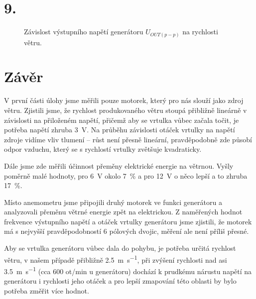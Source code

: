 \documentclass{protokol}
\begin{document}
\section{9.}
	\begin{figure*}[h!]
	\caption{Závislost výstupního napětí generátoru $ U_{OUT(p-p)} $ na rychlosti větru.}
\end{figure*}


		
\section{Závěr}
	V první části úlohy jsme měřili pouze motorek, který pro nás slouží jako zdroj větru. Zjistili jsme, že rychlost produkovaného větru stoupá přibližně lineárně v závislosti na přiloženém napětí, přičemž aby se vrtulka vůbec začala točit, je potřeba napětí zhruba \SI{3}{\volt}. Na průběhu závislosti otáček vrtulky na napětí zdroje vidíme vliv tlumení -- růst není přesně lineární, pravděpodobně zde působí odpor vzduchu, který se s rychlostí vrtulky zvětšuje kvadraticky.
	
	Dále jsme zde měřili účinnost přeměny elektrické energie na větrnou. Vyšly poměrně malé hodnoty, pro \SI{6}{V} okolo \SI{7}{\percent} a pro \SI{12}{\volt} o něco lepší a to zhruba \SI{17}{\percent}.
	
	Místo anemometru jsme připojili druhý motorek ve funkci generátoru a analyzovali přeměnu větrné energie zpět na elektrickou. Z naměřených hodnot frekvence výstupního napětí a otáček vrtulky generátoru jsme zjistili, že motorek má s nejvyšší pravděpodobností 6 pólových dvojic, měření ale není příliš přesné.
	
	Aby se vrtulka generátoru vůbec dala do pohybu, je potřeba určitá rychlost větru, v našem případě přibližně \SI{2,5}{\meter\per\second}, při zvýšení rychlosti nad asi \SI{3.5}{\meter\per\second} (cca 600 ot/min u generátoru) dochází k prudkému nárustu  napětí na generátoru i  rychlosti jeho otáček a pro lepší zmapování této oblasti by bylo potřeba změřit více hodnot.
\end{document}
